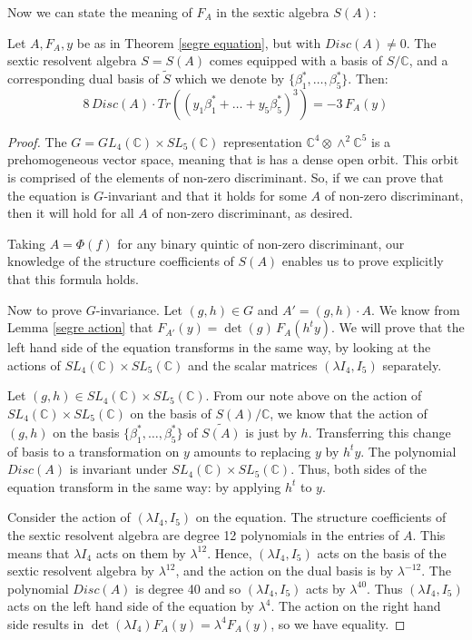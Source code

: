 \documentclass{report}
\begin{document}
Now we can state the meaning of $F_A$ in the sextic algebra $S(A)$:

\begin{theorem} \label{trace cubed}
Let $A, F_A, y$ be as in Theorem \ref{segre equation}, but with $Disc(A) \neq 0$.  The sextic resolvent algebra $S = S(A)$ comes equipped with a basis of $S / \mathbb{C}$, and a corresponding dual basis of $\tilde{S}$ which we denote by $\{ \beta_1^*, \ldots, \beta_5^* \}$.  Then:
\begin{equation}
8 \, Disc(A) \cdot Tr( (y_1 \beta_1^* + \ldots + y_5 \beta_5^*)^3 ) = - 3 \, F_A(y)
\end{equation}
\end{theorem}

\begin{proof}
The $G = GL_4(\mathbb{C}) \times SL_5(\mathbb{C})$ representation $\mathbb{C}^4 \otimes \wedge^2 \mathbb{C}^5$ is a prehomogeneous vector space, meaning that is has a dense open orbit.  This orbit is comprised of the elements of non-zero discriminant.  So, if we can prove that the equation is $G$-invariant and that it holds for some $A$ of non-zero discriminant, then it will hold for all $A$ of non-zero discriminant, as desired.

Taking $A = \Phi(f)$ for any binary quintic of non-zero discriminant, our knowledge of the structure coefficients of $S(A)$ enables us to prove explicitly that this formula holds.

Now to prove $G$-invariance.  Let $(g,h) \in G$ and $A' = (g,h) \cdot A$.  We know from Lemma \ref{segre action} that $F_{A'}(y) = \det(g) \, F_A(h^t y)$.  We will prove that the left hand side of the equation transforms in the same way, by looking at the actions of $SL_4(\mathbb{C}) \times SL_5(\mathbb{C})$ and the scalar matrices $(\lambda I_4, I_5)$ separately.

Let $(g,h) \in SL_4(\mathbb{C}) \times SL_5(\mathbb{C})$.  From our note above on the action of $SL_4(\mathbb{C}) \times SL_5(\mathbb{C})$ on the basis of $S(A)/\mathbb{C}$, we know that the action of $(g,h)$ on the basis $\{\beta_1^*,\ldots,\beta_5^*\}$ of $\tilde{S(A)}$ is just by $h$.  Transferring this change of basis to a transformation on $y$ amounts to replacing $y$ by $h^t y$.  The polynomial $Disc(A)$ is invariant under $SL_4(\mathbb{C}) \times SL_5(\mathbb{C})$.  Thus, both sides of the equation transform in the same way: by applying $h^t$ to $y$.

Consider the action of $(\lambda I_4, I_5)$ on the equation.  The structure coefficients of the sextic resolvent algebra are degree 12 polynomials in the entries of $A$.  This means that $\lambda I_4$ acts on them by $\lambda^{12}$.  Hence, $(\lambda I_4, I_5)$ acts on the basis of the sextic resolvent algebra by $\lambda^{12}$, and the action on the dual basis is by $\lambda^{-12}$.  The polynomial $Disc(A)$ is degree 40 and so $(\lambda I_4, I_5)$ acts by $\lambda^{40}$.  Thus $(\lambda I_4, I_5)$ acts on the left hand side of the equation by $\lambda^4$.  The action on the right hand side results in $\det(\lambda I_4) F_A(y) = \lambda^4 F_A(y)$, so we have equality.
\end{proof}
\end{document}
